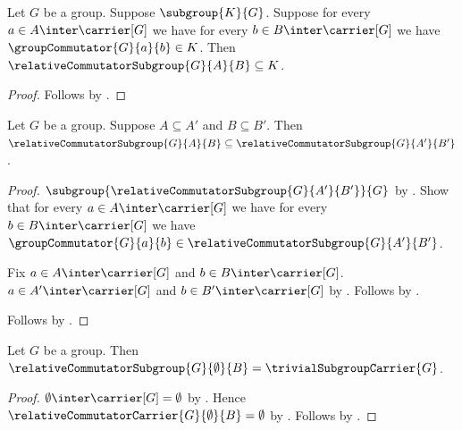 \begin{corollary}\label{relative_commutator_subgroup_least}
    Let $G$ be a group.
    Suppose $\subgroup{K}{G}$.
    Suppose for every $a\in A\inter\carrier[G]$ we have for every
        $b\in B\inter\carrier[G]$ we have
            $\groupCommutator{G}{a}{b}\in K$.
    Then $\relativeCommutatorSubgroup{G}{A}{B}\subseteq K$.
\end{corollary}
\begin{proof}
    Follows by
        .
\end{proof}

\begin{proposition}\label{relative_commutator_subgroup_monotone}
    Let $G$ be a group.
    Suppose $A\subseteq A'$ and $B\subseteq B'$.
    Then
        $\relativeCommutatorSubgroup{G}{A}{B}\subseteq
         \relativeCommutatorSubgroup{G}{A'}{B'}$.
\end{proposition}
\begin{proof}
    $\subgroup{\relativeCommutatorSubgroup{G}{A'}{B'}}{G}$ by
        .
    Show that for every $a\in A\inter\carrier[G]$ we have for every
        $b\in B\inter\carrier[G]$ we have
        $\groupCommutator{G}{a}{b}\in
            \relativeCommutatorSubgroup{G}{A'}{B'}$.
    \begin{subproof}
        Fix $a\in A\inter\carrier[G]$ and
            $b\in B\inter\carrier[G]$.
        $a\in A'\inter\carrier[G]$ and
            $b\in B'\inter\carrier[G]$ by
            .
        Follows by
            .
    \end{subproof}
    Follows by .
\end{proof}

\begin{corollary}\label{relative_commutator_subgroup_empty_left}
    Let $G$ be a group.
    Then
        $\relativeCommutatorSubgroup{G}{\emptyset}{B}=
            \trivialSubgroupCarrier{G}$.
\end{corollary}
\begin{proof}
    $\emptyset\inter\carrier[G]=\emptyset$ by
        .
    Hence $\relativeCommutatorCarrier{G}{\emptyset}{B}=\emptyset$ by
        .
    Follows by
        .
\end{proof}

